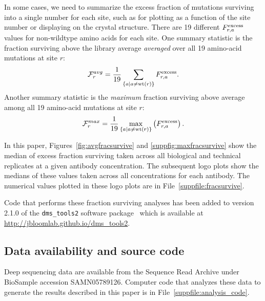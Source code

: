 \documentclass[11pt]{article}
\begin{document}
In some cases, we need to summarize the excess fraction of mutations surviving into a single number for each site, such as for plotting as a function of the site number or displaying on the crystal structure.
There are 19 different $F_{r,a}^{\rm{excess}}$ values for non-wildtype amino acids for each site. 
One summary statistic is the fraction surviving above the library average \emph{averaged} over all 19 amino-acid mutations at site $r$:
\begin{equation}
\label{eq:avgfracsurvive}
\mathcal{F}_r^{avg} = \frac{1}{19} \sum\limits_{\left\{a \mid a \ne \operatorname{wt}\left(r\right)\right\}} F_{r,a}^{\rm{excess}}.
\end{equation}
Another summary statistic is the \emph{maximum} fraction surviving above average among all 19 amino-acid mutations at site $r$:
\begin{equation}
\label{eq:maxfracsurvive}
\mathcal{F}_r^{max} = \frac{1}{19} \max\limits_{\left\{a \mid a \ne \operatorname{wt}\left(r\right)\right\}}\left( F_{r,a}^{\rm{excess}} \right).
\end{equation}

In this paper, Figures~\ref{fig:avgfracsurvive} and \ref{suppfig:maxfracsurvive} show the median of excess fraction surviving taken across all biological and technical replicates at a given antibody concentration.
The subsequent logo plots show the medians of these values taken across all concentrations for each antibody.
The numerical values plotted in these logo plots are in File~\ref{suppfile:fracsurvive}.

Code that performs these fraction surviving analyses has been added to version 2.1.0 of the \texttt{dms\_tools2} software package~\citep{bloom2015software} which is available at \url{http://jbloomlab.github.io/dms_tools2}.

\subsection*{Data availability and source code}
Deep sequencing data are available from the Sequence Read Archive under BioSample accession SAMN05789126.
Computer code that analyzes these data to generate the results described in this paper is in File~\ref{suppfile:analysis_code}.
\end{document}
